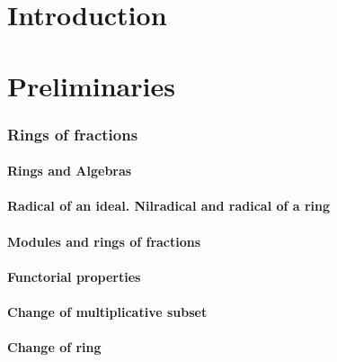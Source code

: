 
\part*{Introduction}


\clearpage

\setcounter{part}{-1}

\part{Preliminaries}

    \section{Rings of fractions}
    \setcounter{subsection}{-1}

        \subsection{Rings and Algebras}
        

        \subsection{Radical of an ideal. Nilradical and radical of a ring}
        

        \subsection{Modules and rings of fractions}
        

        \subsection{Functorial properties}
        

        \subsection{Change of multiplicative subset}
        

        \subsection{Change of ring}
        

